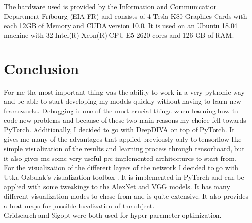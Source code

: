 The hardware used is provided by the Information and Communication Department Fribourg (EIA-FR) and consists of 4 Tesla K80 Graphics Cards with each 12GB of Memory and CUDA version 10.0. It is used on an Ubuntu 18.04 machine with 32 Intel(R) Xeon(R) CPU E5-2620 cores and 126 GB of RAM. 

\section{Conclusion}

For me the most important thing was the ability to work in a very pythonic way and be able to start developing my models quickly without having to learn new frameworks. Debugging is one of the most crucial things when learning how to code new problems and because of these two main reasons my choice fell towards PyTorch. Additionally, I decided to go with DeepDIVA on top of PyTorch. It gives me many of the advantages that applied previously only to tensorflow like simple visualization of the results and learning process through tensorboard, but it also gives me some very useful pre-implemented architectures to start from. \\

For the visualization of the different layers of the network I decided to go with Utku Ozbulak's visualization toolbox \cite{viztoolbox}. It is implemented in PyTorch and can be applied with some tweakings to the AlexNet and VGG models. It has many different visualization modes to chose from and is quite extensive. It also provides a heat maps for possible localization of the object. \\

Gridsearch and Sigopt were both used for hyper parameter optimization.